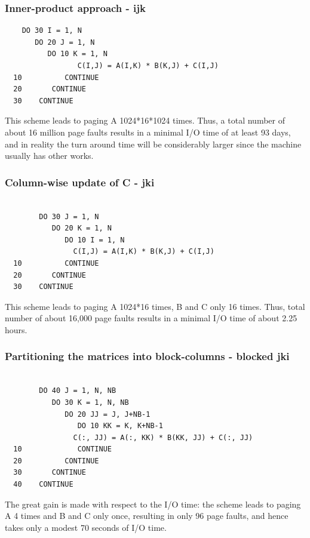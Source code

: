 \subsubsection{Inner-product approach - ijk}
\begin{verbatim}
	DO 30 I = 1, N
	   DO 20 J = 1, N
	      DO 10 K = 1, N
                 C(I,J) = A(I,K) * B(K,J) + C(I,J) 
  10          CONTINUE
  20       CONTINUE
  30    CONTINUE
\end{verbatim}

This scheme leads to paging A 1024*16*1024 times. Thus, a total number of about 16 million page faults results in a minimal I/O time of at least 93 days, and
in reality the turn around time will be considerably larger since the machine usually has other works.

\subsubsection{Column-wise update of C - jki}

\begin{verbatim}

        DO 30 J = 1, N
           DO 20 K = 1, N
              DO 10 I = 1, N
                C(I,J) = A(I,K) * B(K,J) + C(I,J)
  10          CONTINUE
  20       CONTINUE
  30    CONTINUE

\end{verbatim}

This scheme leads to paging A 1024*16 times, B and C only 16 times. Thus, total number of about 16,000 page faults results in a minimal I/O time of
about 2.25 hours.


\subsubsection{Partitioning the matrices into block-columns - blocked jki}

\begin{verbatim}

        DO 40 J = 1, N, NB
           DO 30 K = 1, N, NB
              DO 20 JJ = J, J+NB-1
                 DO 10 KK = K, K+NB-1
                C(:, JJ) = A(:, KK) * B(KK, JJ) + C(:, JJ)
  10             CONTINUE
  20          CONTINUE
  30       CONTINUE
  40    CONTINUE

\end{verbatim}

The great gain is made with respect to the I/O time: the scheme leads to paging A 4 times and B and C only once, resulting in only 96 page faults, and hence
takes only a modest 70 seconds of I/O time.



